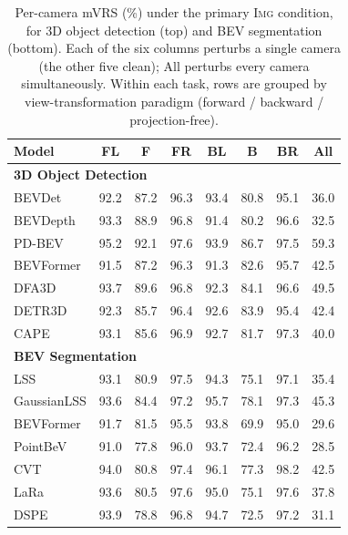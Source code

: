 \begin{table}[t]\centering
\setlength{\tabcolsep}{4pt}
\begin{tabular}{l cccccc c}
\toprule
Model & FL & F & FR & BL & B & BR & All\\
\midrule
\multicolumn{8}{l}{\textbf{3D Object Detection}}\\
\midrule
BEVDet   & 92.2 & 87.2 & 96.3 & 93.4 & 80.8 & 95.1 & 36.0\\
BEVDepth & 93.3 & 88.9 & 96.8 & 91.4 & 80.2 & 96.6 & 32.5\\
PD-BEV   & 95.2 & 92.1 & 97.6 & 93.9 & 86.7 & 97.5 & 59.3\\
\midrule
BEVFormer & 91.5 & 87.2 & 96.3 & 91.3 & 82.6 & 95.7 & 42.5\\
DFA3D     & 93.7 & 89.6 & 96.8 & 92.3 & 84.1 & 96.6 & 49.5\\
DETR3D    & 92.3 & 85.7 & 96.4 & 92.6 & 83.9 & 95.4 & 42.4\\
\midrule
CAPE      & 93.1 & 85.6 & 96.9 & 92.7 & 81.7 & 97.3 & 40.0\\
\midrule
\multicolumn{8}{l}{\textbf{BEV Segmentation}}\\
\midrule
LSS         & 93.1 & 80.9 & 97.5 & 94.3 & 75.1 & 97.1 & 35.4\\
GaussianLSS & 93.6 & 84.4 & 97.2 & 95.7 & 78.1 & 97.3 & 45.3\\
\midrule
BEVFormer & 91.7 & 81.5 & 95.5 & 93.8 & 69.9 & 95.0 & 29.6\\
PointBeV  & 91.0 & 77.8 & 96.0 & 93.7 & 72.4 & 96.2 & 28.5\\
\midrule
CVT  & 94.0 & 80.8 & 97.4 & 96.1 & 77.3 & 98.2 & 42.5\\
LaRa & 93.6 & 80.5 & 97.6 & 95.0 & 75.1 & 97.6 & 37.8\\
DSPE & 93.9 & 78.8 & 96.8 & 94.7 & 72.5 & 97.2 & 31.1\\
\bottomrule
\end{tabular}
\caption{Per-camera mVRS (\%) under the primary \textsc{Img} condition, for 3D object detection (top) and BEV segmentation (bottom). Each of the six columns perturbs a single camera (the other five clean); All perturbs every camera simultaneously. Within each task, rows are grouped by view-transformation paradigm (forward / backward / projection-free).}
\label{tab:supp_percam}
\end{table}
